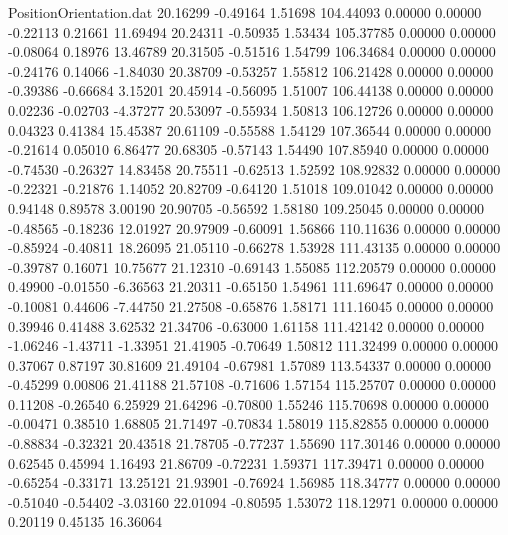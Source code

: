 \begin{filecontents}{PositionOrientation.dat}
  20.16299   -0.49164    1.51698   104.44093    0.00000    0.00000   -0.22113    0.21661   11.69494
  20.24311   -0.50935    1.53434   105.37785    0.00000    0.00000   -0.08064    0.18976   13.46789
  20.31505   -0.51516    1.54799   106.34684    0.00000    0.00000   -0.24176    0.14066   -1.84030
  20.38709   -0.53257    1.55812   106.21428    0.00000    0.00000   -0.39386   -0.66684    3.15201
  20.45914   -0.56095    1.51007   106.44138    0.00000    0.00000    0.02236   -0.02703   -4.37277
  20.53097   -0.55934    1.50813   106.12726    0.00000    0.00000    0.04323    0.41384   15.45387
  20.61109   -0.55588    1.54129   107.36544    0.00000    0.00000   -0.21614    0.05010    6.86477
  20.68305   -0.57143    1.54490   107.85940    0.00000    0.00000   -0.74530   -0.26327   14.83458
  20.75511   -0.62513    1.52592   108.92832    0.00000    0.00000   -0.22321   -0.21876    1.14052
  20.82709   -0.64120    1.51018   109.01042    0.00000    0.00000    0.94148    0.89578    3.00190
  20.90705   -0.56592    1.58180   109.25045    0.00000    0.00000   -0.48565   -0.18236   12.01927
  20.97909   -0.60091    1.56866   110.11636    0.00000    0.00000   -0.85924   -0.40811   18.26095
  21.05110   -0.66278    1.53928   111.43135    0.00000    0.00000   -0.39787    0.16071   10.75677
  21.12310   -0.69143    1.55085   112.20579    0.00000    0.00000    0.49900   -0.01550   -6.36563
  21.20311   -0.65150    1.54961   111.69647    0.00000    0.00000   -0.10081    0.44606   -7.44750
  21.27508   -0.65876    1.58171   111.16045    0.00000    0.00000    0.39946    0.41488    3.62532
  21.34706   -0.63000    1.61158   111.42142    0.00000    0.00000   -1.06246   -1.43711   -1.33951
  21.41905   -0.70649    1.50812   111.32499    0.00000    0.00000    0.37067    0.87197   30.81609
  21.49104   -0.67981    1.57089   113.54337    0.00000    0.00000   -0.45299    0.00806   21.41188
  21.57108   -0.71606    1.57154   115.25707    0.00000    0.00000    0.11208   -0.26540    6.25929
  21.64296   -0.70800    1.55246   115.70698    0.00000    0.00000   -0.00471    0.38510    1.68805
  21.71497   -0.70834    1.58019   115.82855    0.00000    0.00000   -0.88834   -0.32321   20.43518
  21.78705   -0.77237    1.55690   117.30146    0.00000    0.00000    0.62545    0.45994    1.16493
  21.86709   -0.72231    1.59371   117.39471    0.00000    0.00000   -0.65254   -0.33171   13.25121
  21.93901   -0.76924    1.56985   118.34777    0.00000    0.00000   -0.51040   -0.54402   -3.03160
  22.01094   -0.80595    1.53072   118.12971    0.00000    0.00000    0.20119    0.45135   16.36064

\end{filecontents}
